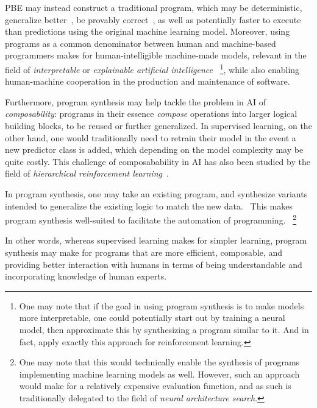 \documentclass{article}
\begin{document}
PBE may instead construct a traditional program,
which may be deterministic, generalize better~\citep{nps}, be provably correct~\citep{nps}, as well as potentially faster to execute than predictions using the original machine learning model.
Moreover, using programs as a common denominator between human and machine-based programmers makes for human-intelligible machine-made models,
relevant in the field of \emph{interpretable} or \emph{explainable artificial intelligence}
~\footnote{
    One may note that if the goal in using program synthesis is to make models more interpretable,
    one could potentially start out by training a neural model, then approximate this by synthesizing a program similar to it. And in fact, \citet{pirl} apply exactly this approach for reinforcement learning.
},
while also enabling human-machine cooperation in the production and maintenance of software.

Furthermore, program synthesis may help tackle the problem in AI of \emph{composability}:
programs in their essence \emph{compose} operations into larger logical building blocks,
to be reused or further generalized.
In supervised learning, on the other hand,
one would traditionally need to retrain their model in the event a new predictor class is added,
which depending on the model complexity may be quite costly.
This challenge of composabability in AI has also been studied by the field of \emph{hierarchical reinforcement learning}~\citep{hierarchicalrl}.

In program synthesis, one may take an existing program, and synthesize variants intended to generalize the existing logic to match the new data.~\citep{myth}
This makes program synthesis well-suited to facilitate the automation of programming.
~\footnote{
    One may note that this would technically enable the synthesis of programs implementing machine learning models as well.
    However, such an approach would make for a relatively expensive evaluation function,
    and as such is traditionally delegated to the field of \emph{neural architecture search}.
}

In other words, whereas supervised learning makes for simpler learning,
program synthesis may make for programs that are more efficient, composable,
and providing better interaction with humans in terms of being understandable and incorporating knowledge of human experts.
\end{document}
